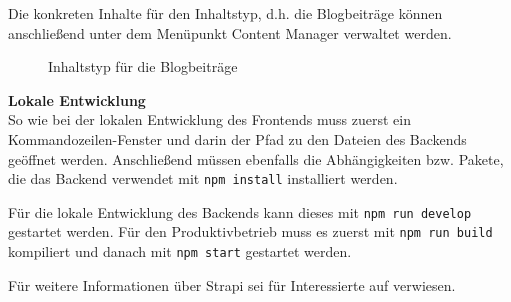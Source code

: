 Die konkreten Inhalte für den Inhaltstyp, d.h. die Blogbeiträge können anschließend unter dem Menüpunkt \glqq Content Manager\grqq{} verwaltet werden.

\begin{figure}[H]
  \setlength{\fboxsep}{0pt}
  \setlength{\fboxrule}{0.5pt}
  \centering
  \caption[Inhaltstyp für die Blogbeiträge]{Inhaltstyp für die Blogbeiträge}
  \label{fig:backend-content-type-builder}
\end{figure}

\textbf{Lokale Entwicklung} \\
So wie bei der lokalen Entwicklung des Frontends muss zuerst ein Kommandozeilen-Fenster und darin der Pfad zu den Dateien des Backends geöffnet werden. Anschließend müssen ebenfalls die Abhängigkeiten bzw. Pakete, die das Backend verwendet mit \glqq \lstinline{npm install}\grqq{} installiert werden.

Für die lokale Entwicklung des Backends kann dieses mit \glqq \lstinline{npm run develop}\grqq{} gestartet werden. Für den Produktivbetrieb muss es zuerst mit \glqq \lstinline{npm run build}\grqq{} kompiliert und danach mit \glqq \lstinline{npm start}\grqq{} gestartet werden.

Für weitere Informationen über Strapi sei für Interessierte auf \cite{Strapi} verwiesen.
